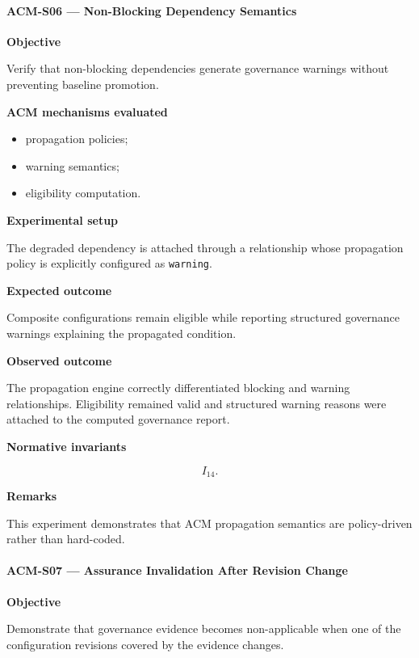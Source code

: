 \documentclass[10pt]{article}
\begin{document}
\paragraph{ACM-S06 --- Non-Blocking Dependency Semantics}

\textbf{Objective}

Verify that non-blocking dependencies generate governance warnings without
preventing baseline promotion.

\textbf{ACM mechanisms evaluated}

\begin{itemize}
    \item propagation policies;
    \item warning semantics;
    \item eligibility computation.
\end{itemize}

\textbf{Experimental setup}

The degraded dependency is attached through a relationship whose propagation
policy is explicitly configured as \texttt{warning}.

\textbf{Expected outcome}

Composite configurations remain eligible while reporting structured governance
warnings explaining the propagated condition.

\textbf{Observed outcome}

The propagation engine correctly differentiated blocking and warning
relationships. Eligibility remained valid and structured warning reasons were
attached to the computed governance report.

\textbf{Normative invariants}

\[
I_{14}.
\]

\textbf{Remarks}

This experiment demonstrates that ACM propagation semantics are policy-driven
rather than hard-coded.

\paragraph{ACM-S07 --- Assurance Invalidation After Revision Change}

\textbf{Objective}

Demonstrate that governance evidence becomes non-applicable when one of the
configuration revisions covered by the evidence changes.
\end{document}
